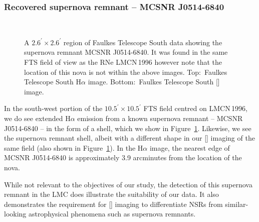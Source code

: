 \documentclass[fleqn,usenatbib]{mnras}
\begin{document}
\subsubsection{Recovered supernova remnant -- MCSNR J0514-6840}\label{MCSNR J0514-6840}
\begin{figure}
\centering
{} \\
\caption{A $2.6^\prime\times2.6^\prime$ region of Faulkes Telescope South data showing the supernova remnant MCSNR J0514-6840. It was found in the same FTS field of view as the RNe LMCN\,1996 however note that the location of this nova is not within the above images. Top:\ Faulkes Telescope South H$\alpha$ image. Bottom:\ Faulkes Telescope South [] image.}
\label{SNR}
\end{figure}
In the south-west portion of the $10.5^{\prime} \times 10.5^{\prime}$ FTS field centred on LMCN\,1996, we do see extended H$\alpha$ emission from a known supernova remnant -- MCSNR J0514-6840 \citep[for example, see Figure 3 in][]{2014A&A...561A..76M} -- in the form of a shell, which we show in Figure~\ref{SNR}. Likewise, we see the supernova remnant shell, albeit with a different shape in our [] imaging of the same field (also shown in Figure~\ref{SNR}). In the H$\alpha$ image, the nearest edge of MCSNR J0514-6840 is approximately 3.9 arcminutes from the location of the nova.

While not relevant to the objectives of our study, the detection of this supernova remnant in the LMC does illustrate the suitability of our data. It also demonstrates the requirement for [] imaging to differentiate NSRs from similar-looking astrophysical phenomena such as supernova remnants.
\end{document}

